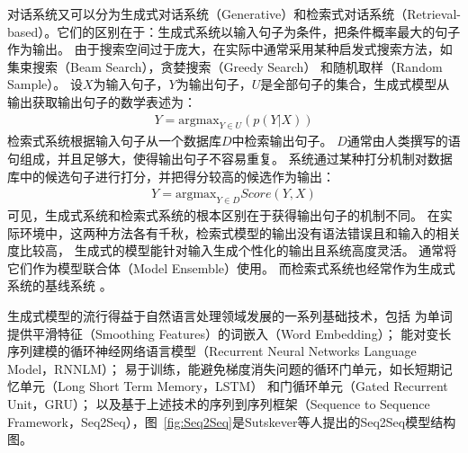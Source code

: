 对话系统又可以分为生成式对话系统（Generative）和检索式对话系统（Retrieval-based）。它们的区别在于：生成式系统以输入句子为条件，把条件概率最大的句子作为输出。
由于搜索空间过于庞大，在实际中通常采用某种启发式搜索方法，如集束搜索（Beam Search），贪婪搜索（Greedy Search）
和随机取样（Random Sample）。
设$X$为输入句子，$Y$为输出句子，$U$是全部句子的集合，生成式模型从输出获取输出句子的数学表述为：
\begin{align}
    Y = \text{argmax}_{Y\in U} \left(p(Y|X)\right)
\end{align}
检索式系统根据输入句子从一个数据库$D$中检索输出句子。
$D$通常由人类撰写的语句组成，并且足够大，使得输出句子不容易重复。
系统通过某种打分机制对数据库中的候选句子进行打分，并把得分较高的候选作为输出：
\begin{align}
    Y = \text{argmax}_{Y\in D} Score(Y, X)
\end{align}
可见，生成式系统和检索式系统的根本区别在于获得输出句子的机制不同。
在实际环境中，这两种方法各有千秋，检索式模型的输出没有语法错误且和输入的相关度比较高，
生成式的模型能针对输入生成个性化的输出且系统高度灵活。
通常将它们作为模型联合体（Model Ensemble）使用。
而检索式系统也经常作为生成式系统的基线系统
。

生成式模型的流行得益于自然语言处理领域发展的一系列基础技术，包括
为单词提供平滑特征（Smoothing Features）的词嵌入（Word Embedding）；
能对变长序列建模的循环神经网络语言模型（Recurrent Neural Networks Language Model，RNNLM）；
易于训练，能避免梯度消失问题的循环门单元，如长短期记忆单元（Long Short Term Memory，LSTM）
和门循环单元（Gated Recurrent Unit，GRU）；
以及基于上述技术的序列到序列框架（Sequence to Sequence Framework，Seq2Seq），图~\ref{fig:Seq2Seq}是Sutskever等人提出的Seq2Seq模型结构图。

